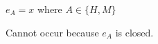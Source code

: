 \begin{case}

$e_{A}=x$ where $A\in\lbrace H,M\rbrace$

Cannot occur because $e_{A}$ is closed.

\end{case}